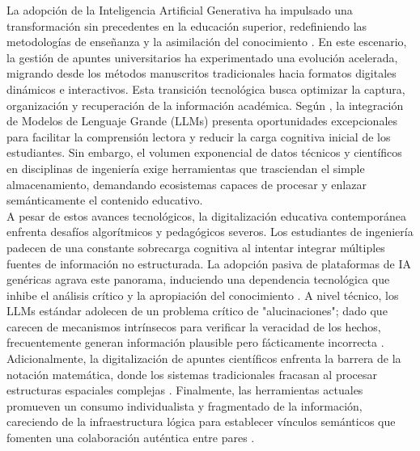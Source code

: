 

La adopción de la Inteligencia Artificial Generativa ha impulsado una transformación sin precedentes en la educación superior, redefiniendo las metodologías de enseñanza y la asimilación del conocimiento \parencite{Vieriu2025}. En este escenario, la gestión de apuntes universitarios ha experimentado una evolución acelerada, migrando desde los métodos manuscritos tradicionales hacia formatos digitales dinámicos e interactivos. Esta transición tecnológica busca optimizar la captura, organización y recuperación de la información académica. Según \textcite{Kreijkes2026}, la integración de Modelos de Lenguaje Grande (LLMs) presenta oportunidades excepcionales para facilitar la comprensión lectora y reducir la carga cognitiva inicial de los estudiantes. Sin embargo, el volumen exponencial de datos técnicos y científicos en disciplinas de ingeniería exige herramientas que trasciendan el simple almacenamiento, demandando ecosistemas capaces de procesar y enlazar semánticamente el contenido educativo.\\

A pesar de estos avances tecnológicos, la digitalización educativa contemporánea enfrenta desafíos algorítmicos y pedagógicos severos. Los estudiantes de ingeniería padecen de una constante sobrecarga cognitiva al intentar integrar múltiples fuentes de información no estructurada. La adopción pasiva de plataformas de IA genéricas agrava este panorama, induciendo una dependencia tecnológica que inhibe el análisis crítico y la apropiación del conocimiento \parencite{Vieriu2025}. A nivel técnico, los LLMs estándar adolecen de un problema crítico de "alucinaciones"; dado que carecen de mecanismos intrínsecos para verificar la veracidad de los hechos, frecuentemente generan información plausible pero fácticamente incorrecta \parencite{Chen2023}. Adicionalmente, la digitalización de apuntes científicos enfrenta la barrera de la notación matemática, donde los sistemas tradicionales fracasan al procesar estructuras espaciales complejas \parencite{AlvarezPerez2026}. Finalmente, las herramientas actuales promueven un consumo individualista y fragmentado de la información, careciendo de la infraestructura lógica para establecer vínculos semánticos que fomenten una colaboración auténtica entre pares \parencite{Jiang2025}.\\

